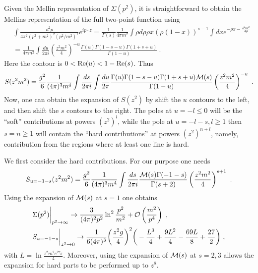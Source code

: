 \documentclass[a4paper,11pt]{article}
\begin{document}
Given the Mellin representation of $\Sigma(p^2)$, it is straightforward to obtain the Mellins representation of the full two-point function using
\begin{align}
&\int \frac{d^2p}{4\pi^2(p^2+m^2)^2(p^2/m^2)^s}e^{ip\cdot z}=\frac{1}{\Gamma(s)}\frac{1}{4\pi m^2}\int \rho d\rho  \rho x (\rho(1-x))^{s-1}\int dxe^{-\rho  x-\frac{z^2m^2}{4\rho}} \nonumber \\
&=\frac{1}{4\pi m^2} \int \frac{du}{2\pi i} \left(\frac{z^2m^2}{4}\right)^{-u}\frac{\Gamma (u)\Gamma (1-s-u) \Gamma (1+s+u)}{\Gamma (1-u)} \ .
\end{align}
Here the contour is $0<{\rm Re}(u)<1-{\rm Re}(s)$. Thus
\begin{align}
S(z^2m^2)=\frac{g^2}{6}\frac{1}{(4\pi)^3m^4}\int \frac{ds}{2\pi i}\int\frac{du}{2\pi }\frac{\Gamma (u)\Gamma (1-s-u) \Gamma (1+s+u){\cal M}(s)}{\Gamma (1-u)} \left(\frac{z^2m^2}{4}\right)^{-u} \ .
\end{align}
Now, one can obtain the expansion of $S(z^2)$ by shift the $u$ contours to the left, and then shift the $s$ contours to the right. The poles at $u=-l\le 0$ will be the ``soft'' contributions at powers $(z^2)^l$, while the pole at $u=-l-s, l\ge 1$ then $s=n\ge 1$ will contain the ``hard contributions'' at powers $(z^2)^{n+l}$, namely, contribution from the regions where at least one line is hard.  

We first consider the hard contributions. For our purpose one needs 
\begin{align}
{S}_{u=-1-s}(z^2m^2)=\frac{g^2}{6}\frac{1}{(4\pi)^3m^4}\int \frac{ds}{2\pi i}\frac{ {\cal M}(s) \Gamma (-1-s) }{\Gamma (s+2)}\left(\frac{z^2m^2}{4}\right)^{s+1} \ .
\end{align}
 Using the expansion of ${\cal M}(s)$ at $s=1$ one obtains 
\begin{align}
&\Sigma(p^2)\bigg|_{p^2\rightarrow \infty}\rightarrow \frac{3}{(4\pi)^2 p^2} \ln^2\frac{p^2}{m^2}+{\cal O}\left(\frac{m^2}{p^4}\right) \ , \\ 
&S_{u=-1-s}\bigg|_{z^2\rightarrow0}\rightarrow \frac{1}{6(4\pi)^3}\bigg(\frac{z^2g}{4}\bigg)^2\bigg(-\frac{L^3}{4}+\frac{9 L^2}{4}-\frac{69 L}{8}+\frac{27}{2}\bigg) \ ,
\end{align}
with $L=\ln \frac{z^2m^2e^{2\gamma_E}}{4}$. 
Moreover, using the expansion of ${\cal M}(s)$ at $s=2,3$ allows the expansion for hard parts to be performed up to $z^8$. 
\end{document}
